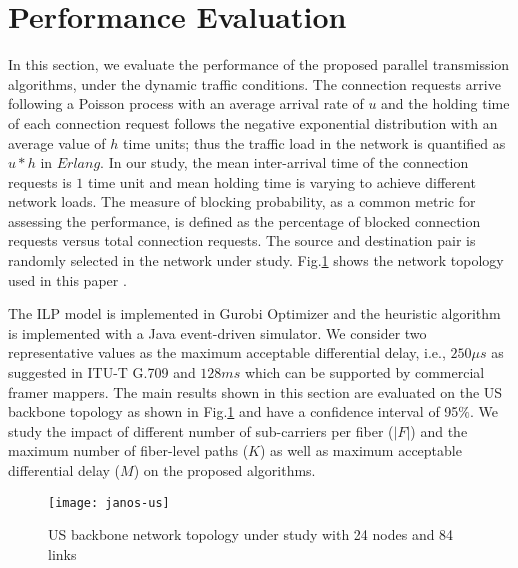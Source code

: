 \documentclass[conference]{IEEEtran}
\begin{document}
\section{Performance Evaluation}\label{performance}
\par In this section, we evaluate the performance of the proposed parallel transmission algorithms, under the dynamic traffic conditions. The connection requests arrive following a Poisson process with an average arrival rate of $u$ and 
the holding time of each connection request follows the negative exponential distribution with an average value of $h$ 
time units; thus the traffic load in the network is quantified as $u*h$ in $Erlang$.  
In our study, the mean inter-arrival time of the connection requests is $1$ time unit and mean holding time is varying 
to achieve different network loads.  The measure of blocking probability, as a common metric for assessing the performance, is defined as the percentage of blocked connection requests versus total connection requests. The source and destination pair is randomly selected in the network 
under study.    Fig.\ref{fig:us} shows the network topology used in this paper \cite{SNDlib}.  


\par The  ILP model  is implemented in Gurobi Optimizer \cite{gurobi} and the heuristic algorithm 
is implemented with a Java event-driven simulator.  
  We consider two representative values as the maximum acceptable differential delay, i.e., 
 $250\mu s$ as suggested in ITU-T G.709 \cite{ITU-T:G.709}  and $128ms$ which can be supported by commercial framer 
 mappers\cite{Intel:datasheet}.  The main results shown in this section are evaluated on the US backbone topology as shown in Fig.\ref{fig:us} and  have a confidence interval of 95$\%$.      
      We study the impact of different number of sub-carriers per fiber ($|F|$) and  the maximum number of fiber-level paths ($K$) as well as maximum acceptable differential delay ($M$) on the proposed algorithms.
\begin{figure}
	\centering
	\texttt{[image: janos-us]} 
  \caption{US backbone network topology \cite{SNDlib} under study with 24 nodes and 84 links} \label{fig:us} 
  \vspace{-0.3cm}
 \end{figure} 
\end{document}
